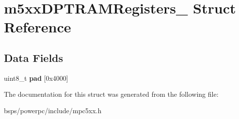 \hypertarget{structm5xxDPTRAMRegisters__}{}\section{m5xx\+D\+P\+T\+R\+A\+M\+Registers\+\_\+ Struct Reference}
\label{structm5xxDPTRAMRegisters__}
\subsection*{Data Fields}
\begin{DoxyCompactItemize}
\item 
\mbox{\label{structm5xxDPTRAMRegisters___ad4583a939618c8830f4bc02b7c17d0c8}} 
uint8\+\_\+t {\bfseries pad} \mbox{[}0x4000\mbox{]}
\end{DoxyCompactItemize}


The documentation for this struct was generated from the following file\+:\begin{DoxyCompactItemize}
\item 
bsps/powerpc/include/mpc5xx.\+h\end{DoxyCompactItemize}
